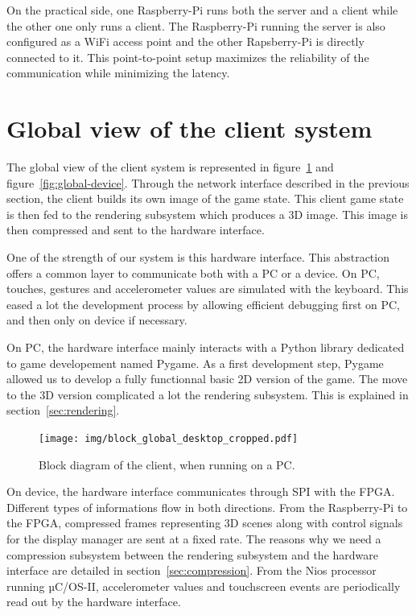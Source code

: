 \documentclass[english, DIV=13]{scrartcl}
\begin{document}
On the practical side, one Raspberry-Pi runs both the server and a client while the other
one only runs a client.
The Raspberry-Pi running the server is also configured as a WiFi access point and the other
Rapsberry-Pi is directly connected to it. This point-to-point setup maximizes the
reliability of the communication while minimizing the latency.

\section{Global view of the client system}
\label{sec:global-view}

The global view of the client system is represented in figure~\ref{fig:global-desktop}
and figure~\ref{fig:global-device}. Through the network interface described in the
previous section, the client builds its own image of the game state. This client game
state is then fed to the rendering subsystem which produces a 3D image. This image
is then compressed and sent to the hardware interface.

One of the strength of our system is this hardware interface. This abstraction offers
a common layer to communicate both with a PC or a device.
On PC, touches, gestures and accelerometer values are simulated with the keyboard.
This eased a lot the development process by allowing efficient debugging first on PC,
and then only on device if necessary.

On PC, the hardware interface mainly interacts with a Python library dedicated to game
developement named Pygame. As a first development step, Pygame allowed us to develop
a fully functionnal basic 2D version of the game. The move to the 3D version
complicated a lot the rendering subsystem. This is explained in
section~\ref{sec:rendering}.

\begin{figure}
    \centering
    \texttt{[image: img/block\_global\_desktop\_cropped.pdf]}
    \caption{Block diagram of the client, when running on a PC.}
    \label{fig:global-desktop}
\end{figure}

On device, the hardware interface communicates through SPI with the FPGA.
Different types of informations flow in both directions. From the Raspberry-Pi to the
FPGA, compressed frames representing 3D scenes along with control signals for the
display manager are sent at a fixed rate. The reasons why we need a compression
subsystem between the rendering subsystem and the hardware interface are detailed in
section~\ref{sec:compression}. From the Nios processor running µC/OS-II, accelerometer
values and touchscreen events are periodically read out by the hardware interface.
\end{document}
